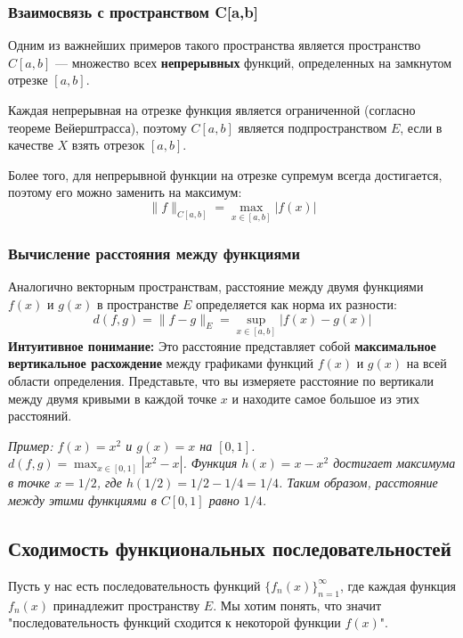 \documentclass[a4paper, 12pt]{report}
\numberwithin{equation}{section}
\begin{document}
	\subsubsection{Взаимосвязь с пространством C[a,b]}
	
	Одним из важнейших примеров такого пространства является пространство $C[a,b]$ — множество всех \textbf{непрерывных} функций, определенных на замкнутом отрезке $[a,b]$.
	
	Каждая непрерывная на отрезке функция является ограниченной (согласно теореме Вейерштрасса), поэтому $C[a,b]$ является подпространством $E$, если в качестве $X$ взять отрезок $[a,b]$.
	
	Более того, для непрерывной функции на отрезке супремум всегда достигается, поэтому его можно заменить на максимум:
	$$ \|f\|_{C[a,b]} = \max_{x \in [a,b]} |f(x)| $$
	
	\subsubsection{Вычисление расстояния между функциями}
	
	Аналогично векторным пространствам, расстояние между двумя функциями $f(x)$ и $g(x)$ в пространстве $E$ определяется как норма их разности:
	$$ d(f, g) = \|f - g\|_E = \sup_{x \in [a,b]} |f(x) - g(x)| $$
	\textbf{Интуитивное понимание:} Это расстояние представляет собой \textbf{максимальное вертикальное расхождение} между графиками функций $f(x)$ и $g(x)$ на всей области определения. Представьте, что вы измеряете расстояние по вертикали между двумя кривыми в каждой точке $x$ и находите самое большое из этих расстояний.
	
	\begin{center}
		\textit{Пример: $f(x) = x^2$ и $g(x) = x$ на $[0,1]$.\\
			$d(f,g) = \max_{x \in [0,1]} |x^2 - x|$. Функция $h(x)=x-x^2$ достигает максимума в точке $x=1/2$, где $h(1/2) = 1/2 - 1/4 = 1/4$. Таким образом, расстояние между этими функциями в $C[0,1]$ равно $1/4$.}
	\end{center}
	
	\subsection{Сходимость функциональных последовательностей}
	
	Пусть у нас есть последовательность функций $\{f_n(x)\}_{n=1}^\infty$, где каждая функция $f_n(x)$ принадлежит пространству $E$. Мы хотим понять, что значит "последовательность функций сходится к некоторой функции $f(x)$".
	
\end{document}

